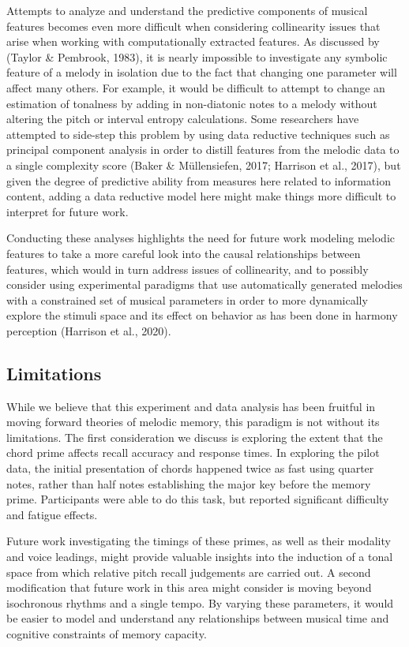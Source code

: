 \documentclass[english,man,floatsintext]{apa6}
\begin{document}
Attempts to analyze and understand the predictive components of musical features becomes even more difficult when considering collinearity issues that arise when working with computationally extracted features.
As discussed by (Taylor \& Pembrook, 1983), it is nearly impossible to investigate any symbolic feature of a melody in isolation due to the fact that changing one parameter will affect many others.
For example, it would be difficult to attempt to change an estimation of tonalness by adding in non-diatonic notes to a melody without altering the pitch or interval entropy calculations.
Some researchers have attempted to side-step this problem by using data reductive techniques such as principal component analysis in order to distill features from the melodic data to a single complexity score (Baker \& Müllensiefen, 2017; Harrison et al., 2017), but given the degree of predictive ability from measures here related to information content, adding a data reductive model here might make things more difficult to interpret for future work.

Conducting these analyses highlights the need for future work modeling melodic features to take a more careful look into the causal relationships between features, which would in turn address issues of collinearity, and to possibly consider using experimental paradigms that use automatically generated melodies with a constrained set of musical parameters in order to more dynamically explore the stimuli space and its effect on behavior as has been done in harmony perception (Harrison et al., 2020).

\hypertarget{limitations}{%
\subsection{Limitations}\label{limitations}}

While we believe that this experiment and data analysis has been fruitful in moving forward theories of melodic memory, this paradigm is not without its limitations.
The first consideration we discuss is exploring the extent that the chord prime affects recall accuracy and response times.
In exploring the pilot data, the initial presentation of chords happened twice as fast using quarter notes, rather than half notes establishing the major key before the memory prime.
Participants were able to do this task, but reported significant difficulty and fatigue effects.

Future work investigating the timings of these primes, as well as their modality and voice leadings, might provide valuable insights into the induction of a tonal space from which relative pitch recall judgements are carried out.
A second modification that future work in this area might consider is moving beyond isochronous rhythms and a single tempo.
By varying these parameters, it would be easier to model and understand any relationships between musical time and cognitive constraints of memory capacity.
\end{document}
